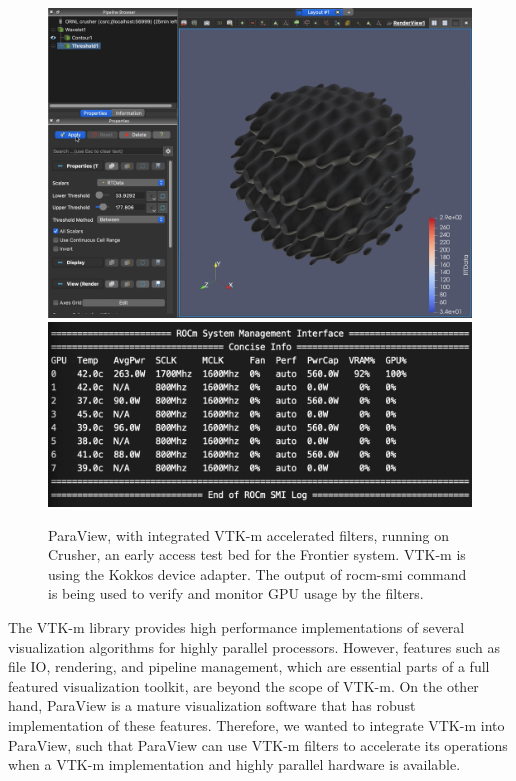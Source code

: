 \begin{figure}[htb]
  \includegraphics[width=\linewidth]{figures/paraview-crusher.png}
  \includegraphics[width=\linewidth]{figures/threshold-vtkm-gpu-usage-crusher-small.png}
  \caption{
    ParaView, with integrated VTK-m accelerated filters, running on Crusher, an early access test bed for the Frontier system.
    VTK-m is using the Kokkos device adapter.
    The output of rocm-smi command is being used to verify and monitor GPU usage by the filters.
  }
  \label{fig:paraview-crusher}
\end{figure}

The VTK-m library provides high performance implementations of several visualization algorithms for highly parallel processors. However, features such as file IO, rendering, and pipeline management, which are essential parts of a full featured visualization toolkit, are beyond the scope of VTK-m. On the other hand, ParaView is a mature visualization software that has robust implementation of these features. Therefore, we wanted to integrate VTK-m into ParaView, such that ParaView can use VTK-m filters to accelerate its operations when a VTK-m implementation and highly parallel hardware is available.

